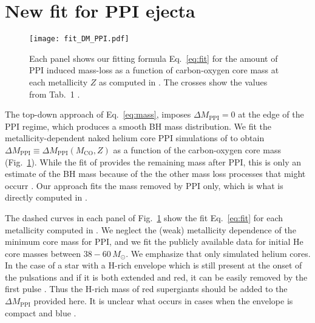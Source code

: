 \documentclass[twocolumn]{aastex63}
\DeclareRobustCommand{\Eqref}[1]{Eq.~\ref{#1}}
\DeclareRobustCommand{\Figref}[1]{Fig.~\ref{#1}}
\begin{document}
\section{New fit for PPI ejecta}

\begin{figure}[bp]
    \begin{centering}
      \texttt{[image: fit\_DM\_PPI.pdf]}
      \caption{Each panel shows our fitting formula \Eqref{eq:fit} for
        the amount of PPI induced mass-loss as a function of carbon-oxygen
        core mass at each metallicity $Z$ as computed in
        \cite{farmer:19}. The crosses show the values from Tab.~1
        \cite{farmer:19}.}
        \label{fig:fit_DM_PPI}
    \end{centering}
\end{figure}

The top-down approach of \Eqref{eq:mass}, imposes
$\Delta M_\mathrm{PPI}=0$ at the edge of the PPI regime,
which produces a smooth BH mass
distribution. We fit the metallicity-dependent naked helium core PPI
simulations of \cite{farmer:19} to obtain
$\Delta M_\mathrm{PPI} \equiv \Delta M_\mathrm{PPI}(M_\mathrm{CO},Z)$ as
a function of the carbon-oxygen core mass (\Figref{fig:fit_DM_PPI}). While the fit of
\cite{farmer:19} provides the remaining mass after PPI, this is only
an estimate of the BH mass because of the the other mass loss processes that
might occurr \citep[e.g.,][]{renzo:20csm, powell:21, rahman:22}. Our approach
fits the mass removed by PPI only, which is what is directly computed
in \cite{farmer:19}.

The dashed curves in each panel of \Figref{fig:fit_DM_PPI} show the
fit \Eqref{eq:fit} for each metallicity computed in
\cite{farmer:19}. We neglect the (weak) metallicity dependence of the
minimum core mass for PPI, and we fit the publicly available data for initial He core
masses between $38-60\,M_\odot$.  We emphasize that \cite{farmer:19}
only simulated helium cores. In the case of a star with a H-rich envelope which is still
present at the onset of the pulsations and if it is both extended and red, it can be
easily removed by the first pulse
\citep[][]{woosley:17,renzo:20csm}. Thus the H-rich mass of red supergiants should be added to the
$\Delta M_\mathrm{PPI}$ provided here. It is unclear what occurs in
cases when the envelope is compact and blue \citep[e.g.,][]{dicarlo:19, renzo:20merger, costa:21}.
\end{document}
